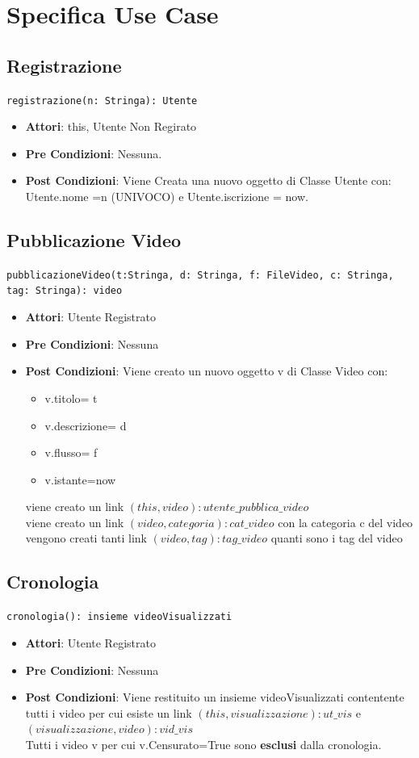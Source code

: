 \documentclass[12pt, letterpaper]{article}
\newcommand{\code}[1]{\colorbox{light-gray}{\texttt{#1}}}
\begin{document}
\section{Specifica Use Case}
\subsection{Registrazione}
\code{registrazione(n: Stringa): Utente}
\begin{itemize}
\item \textbf{Attori}: this, Utente Non Regirato
\item \textbf{Pre Condizioni}: Nessuna.
\item \textbf{Post Condizioni}: Viene Creata una nuovo oggetto di Classe Utente con:\\ Utente.nome =n (UNIVOCO)
e Utente.iscrizione = now.
\end{itemize}
\subsection{Pubblicazione Video}
\code{pubblicazioneVideo(t:Stringa, d: Stringa, f: FileVideo, c: Stringa, tag: Stringa): video}
\begin{itemize}
    \item \textbf{Attori}: Utente Registrato
    \item \textbf{Pre Condizioni}: Nessuna
    \item \textbf{Post Condizioni}: Viene creato un nuovo oggetto v di Classe Video con:
    \begin{itemize}
        \item v.titolo= t
        \item v.descrizione= d
        \item v.flusso= f
        \item v.istante=now
        \end{itemize}
    viene creato un link $(this, video): utente\_pubblica\_video$\\
    viene creato un link $(video, categoria): cat\_video$ con la categoria c del video\\
    vengono creati tanti link $(video, tag): tag\_video$ quanti sono i tag del video
\end{itemize}
\subsection{Cronologia}
\code{cronologia(): insieme videoVisualizzati}
\begin{itemize}
    \item \textbf{Attori}: Utente Registrato
    \item \textbf{Pre Condizioni}: Nessuna
    \item \textbf{Post Condizioni}: Viene restituito un insieme videoVisualizzati contentente tutti i video per cui esiste un link $(this,visualizzazione): ut\_vis$ e $(visualizzazione,video):vid\_vis$
    \\Tutti i video v per cui v.Censurato=True sono \textbf{esclusi} dalla cronologia.
\end{itemize}
\end{document}
